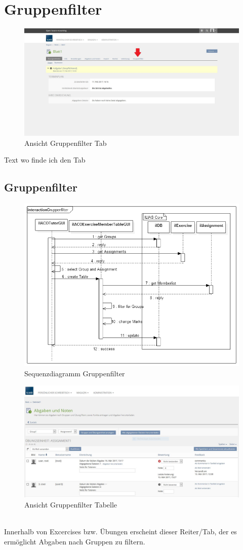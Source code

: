 \chapter{Gruppenfilter}\label{gruppenfilter}
\begin{figure}[h!]
	\centering
	\includegraphics[width=1\textwidth]{img/excerciseGruppenfilter.jpg}
	\caption{Ansicht Gruppenfilter Tab}
\end{figure}

Text wo finde ich den Tab
\newpage
\section{Gruppenfilter}
\begin{figure}[h!]
	\centering
	\includegraphics[width=.7\textwidth]{img/seq_tutorGUI.png}
	\caption{Sequenzdiagramm Gruppenfilter}
\end{figure}
\begin{figure}[h!]
	\centering
	\includegraphics[width=1\textwidth]{img/excerciseGruppentabelle.jpg}
	\caption{Ansicht Gruppenfilter Tabelle}
\end{figure}
~\\Innerhalb von Excercises bzw. Übungen erscheint dieser Reiter/Tab, der es ermöglicht Abgaben nach Gruppen zu filtern. 



